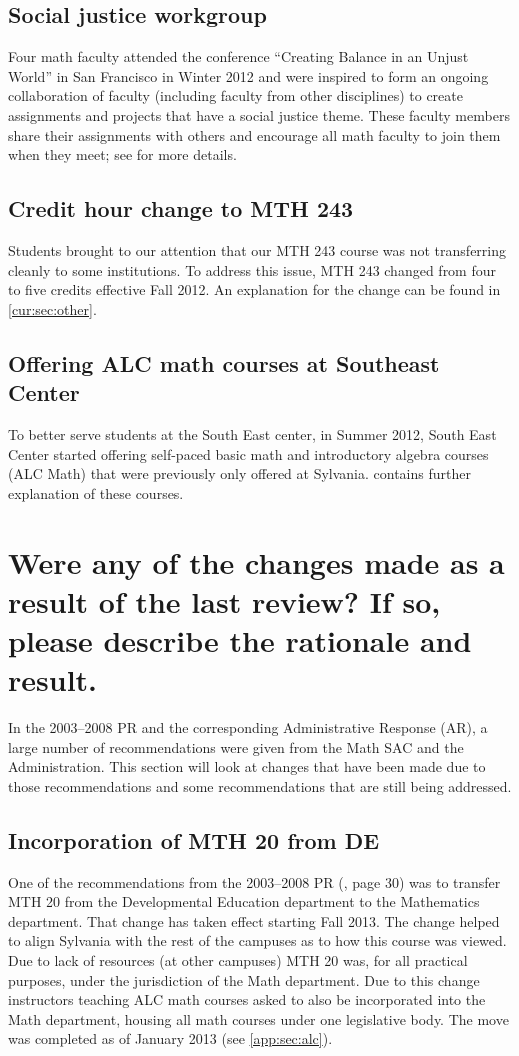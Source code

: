 \subsection{Social justice workgroup} Four math faculty attended the conference
``Creating Balance in an Unjust World'' in San Francisco in Winter 2012
and were inspired to form an ongoing collaboration of faculty (including faculty from other disciplines) to create
assignments and projects that have a social justice theme.  These faculty
members share their assignments with others and encourage all math faculty
to join them when they meet; see  for
more details.
\subsection{Credit hour change to MTH 243} Students brought to our attention that our
MTH 243 course was not transferring cleanly to some institutions.  To
address this issue, MTH 243 changed from four to five credits effective Fall
2012.  An explanation for the change can be found in \vref{cur:sec:other}.
\subsection{Offering ALC math courses at Southeast Center} To better serve students at the South
East center, in Summer 2012, South East Center started offering
self-paced basic math and introductory algebra courses (ALC Math) that were previously only offered at
Sylvania. 
contains further explanation of these courses.

\section[Changes resulting from the last program review]{Were any of the changes
 made as a result of the last review? If so,
 please describe the rationale and result.}\label{over:sec:changesresult}

In the 2003--2008 PR and the corresponding Administrative
Response (AR), a large number of recommendations were given from the Math SAC and
the Administration.  This section will look at changes that have been made due
to those recommendations and some recommendations that are still being
addressed.

\subsection{Incorporation of MTH 20 from DE}
One of the recommendations from the 2003--2008 PR (\cite{mathprogramreview2003}, page 30) was to transfer MTH
20 from the Developmental Education department to the Mathematics department.
That change has taken effect starting Fall 2013.  The change helped to align
Sylvania with the rest of the campuses as to how this course was viewed.   Due
to lack of resources (at other campuses) MTH 20 was, for all practical purposes,
under the jurisdiction of the Math department.  Due to this change instructors
teaching ALC math courses asked to also be incorporated into the Math
department, housing all math courses under one legislative body.  The move was
completed as of January 2013 (see \vref{app:sec:alc}).

